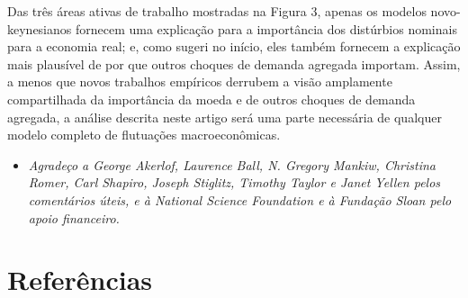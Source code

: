 \documentclass[12pt]{article}
\begin{document}
{Das três áreas ativas de trabalho mostradas na Figura 3, apenas os modelos novo-keynesianos fornecem uma explicação para a importância dos distúrbios nominais para a economia real; e, como sugeri no início, eles também fornecem a explicação mais plausível de por que outros choques de demanda agregada importam. Assim, a menos que novos trabalhos empíricos derrubem a visão amplamente compartilhada da importância da moeda e de outros choques de demanda agregada, a análise descrita neste artigo será uma parte necessária de qualquer modelo completo de flutuações macroeconômicas.

\begin{itemize}
\item \textit{Agradeço a George Akerlof, Laurence Ball, N. Gregory Mankiw, Christina Romer, Carl Shapiro, Joseph Stiglitz, Timothy Taylor e Janet Yellen pelos comentários úteis, e à National Science Foundation e à Fundação Sloan pelo apoio financeiro.}
\end{itemize}

\section*{Referências}

}
\end{document}

